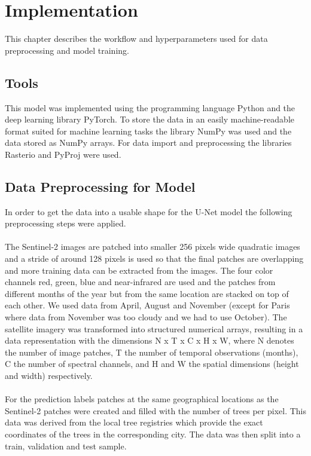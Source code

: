 \section{Implementation}

This chapter describes the workflow and hyperparameters used for data preprocessing and model training.

\subsection{Tools}

This model was implemented using the programming language Python and the deep learning library PyTorch. 
To store the data in an easily machine-readable format suited for machine learning tasks the library NumPy was used and the data stored as NumPy arrays.
For data import and preprocessing the libraries Rasterio and PyProj were used. 

\subsection{Data Preprocessing for Model}

In order to get the data into a usable shape for the U-Net model the following preprocessing steps were applied.\\
\\
The Sentinel-2 images are patched into smaller 256 pixels wide quadratic images and a stride of around 128 pixels is used so that the final patches are overlapping and more training data can be extracted from the images.
The four color channels red, green, blue and near-infrared are used and the patches from different months of the year but from the same location are stacked on top of each other.
We used data from April, August and November (except for Paris where data from November was too cloudy and we had to use October).
The satellite imagery was transformed into structured numerical arrays, resulting in a data representation with the dimensions N x T x C x H x W, where N denotes the number of image patches, T the number of temporal observations (months), C the number of spectral channels, and H and W the spatial dimensions (height and width) respectively.\\
\\
For the prediction labels patches at the same geographical locations as the Sentinel-2 patches were created and filled with the number of trees per pixel. 
This data was derived from the local tree registries which provide the exact coordinates of the trees in the corresponding city.
The data was then split into a train, validation and test sample.

